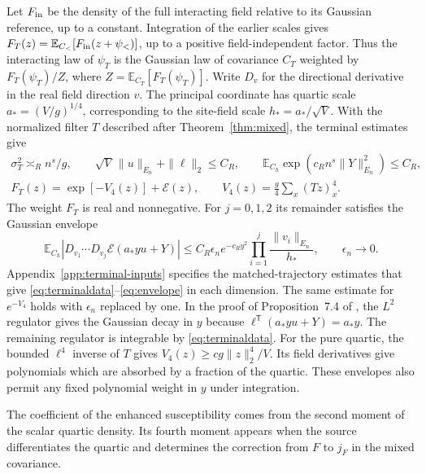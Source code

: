 \documentclass[11pt]{article}
\numberwithin{equation}{section}
\newcommand{\E}{\mathbb E}
\begin{document}
Let $F_{\rm in}$ be the density of the full interacting field relative
to its Gaussian reference, up to a constant. Integration of the
earlier scales gives $F_T(z)=\E_{C_<}[F_{\rm in}(z+\psi_<)]$, up
to a positive field-independent factor. Thus the interacting law of
$\psi_T$ is the Gaussian law of covariance $C_T$ weighted by
$F_T(\psi_T)/Z$, where $Z=\E_{C_T}[F_T(\psi_T)]$.
Write $D_v$ for the directional derivative in the real field
direction $v$. The principal coordinate has quartic scale
$a_*=(V/g)^{1/4}$, corresponding to the site-field scale
$h_*=a_*/\sqrt V$. With the normalized filter $T$ described after
Theorem~\ref{thm:mixed}, the terminal estimates give
\begin{gather}
 \sigma_T^2\asymp_R n^s/g,\qquad
 \sqrt V\,\|u\|_{E_n}+\|\ell\|_2\le C_R,\qquad
 \E_{C_h}\exp(c_R n^s\|Y\|_{E_n}^2)\le C_R,\label{eq:terminaldata}\\
 F_T(z)=\exp[-V_4(z)]+\mathcal E(z),\qquad
 V_4(z)=\frac{g}{4}\sum_x(Tz)_x^4 .
\end{gather}
The weight $F_T$ is real and nonnegative. For $j=0,1,2$ its remainder
satisfies the Gaussian envelope
\begin{equation}
 \E_{C_h}\left|D_{v_1}\cdots D_{v_j}\mathcal E(a_* y u+Y)\right|
 \le C_R\epsilon_n e^{-c_R y^2}
              \prod_{i=1}^j\frac{\|v_i\|_{E_n}}{h_*},
 \qquad \epsilon_n\to0.
 \label{eq:envelope}
\end{equation}
Appendix~\ref{app:terminal-inputs} specifies the matched-trajectory
estimates that give \eqref{eq:terminaldata}--\eqref{eq:envelope} in
each dimension. The same estimate for $e^{-V_4}$ holds with $\epsilon_n$ replaced by
one. In the proof of Proposition~7.4 of \cite{base}, the $L^2$
regulator gives the Gaussian decay in $y$ because
$\ell^{\mathsf T}(a_*yu+Y)=a_*y$. The remaining regulator is
integrable by \eqref{eq:terminaldata}. For the pure quartic, the
bounded $\ell^4$ inverse of $T$ gives $V_4(z)\ge c g\|z\|_2^4/V$.
Its field derivatives give polynomials which are absorbed by a
fraction of the quartic. These envelopes also permit any fixed
polynomial weight in $y$ under integration.

The coefficient of the enhanced susceptibility comes from the second
moment of the scalar quartic density. Its fourth moment appears when
the source differentiates the quartic and determines the correction
from $F$ to $j_F$ in the mixed covariance.
\end{document}
